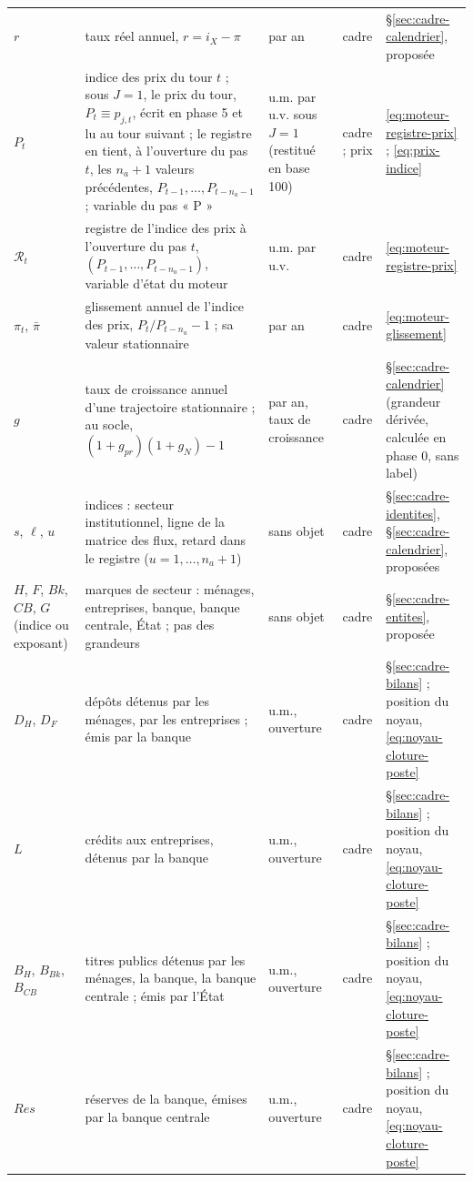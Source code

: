 \documentclass[11pt,a4paper]{article}
\begin{document}
\begin{center}
\begin{longtable}{>{\raggedright\arraybackslash}p{1.6cm}>{\raggedright\arraybackslash}p{5.6cm}>{\raggedright\arraybackslash}p{2.0cm}>{\raggedright\arraybackslash}p{2.2cm}>{\raggedright\arraybackslash}p{2.8cm}}
$r$ & taux réel annuel, $r = i_X - \pi$ & par an & cadre & \S\ref{sec:cadre-calendrier}, proposée\\
$P_t$ & indice des prix du tour $t$ ; sous $J = 1$, le prix du tour, $P_t \equiv p_{j,t}$, écrit en phase 5 et lu au tour suivant ; le registre en tient, à l'ouverture du pas $t$, les $n_a + 1$ valeurs précédentes, $P_{t-1}, \dots, P_{t-n_a-1}$ ; variable du pas « P » & u.m. par u.v. sous $J = 1$ (restitué en base 100) & cadre ; prix & \eqref{eq:moteur-registre-prix} ; \eqref{eq:prix-indice}\\
$\mathcal{R}_t$ & registre de l'indice des prix à l'ouverture du pas $t$, $(P_{t-1}, \dots, P_{t-n_a-1})$, variable d'état du moteur & u.m. par u.v. & cadre & \eqref{eq:moteur-registre-prix}\\
$\pi_t$, $\bar\pi$ & glissement annuel de l'indice des prix, $P_t/P_{t-n_a} - 1$ ; sa valeur stationnaire & par an & cadre & \eqref{eq:moteur-glissement}\\
$g$ & taux de croissance annuel d'une trajectoire stationnaire ; au socle, $(1 + g_{\mathit{pr}})(1 + g_N) - 1$ & par an, taux de croissance & cadre & \S\ref{sec:cadre-calendrier} (grandeur dérivée, calculée en phase 0, sans label)\\
$s$, $\ell$, $u$ & indices : secteur institutionnel, ligne de la matrice des flux, retard dans le registre ($u = 1, \dots, n_a + 1$) & sans objet & cadre & \S\ref{sec:cadre-identites}, \S\ref{sec:cadre-calendrier}, proposées\\
$H$, $F$, $\mathit{Bk}$, $\mathit{CB}$, $G$ (indice ou exposant) & marques de secteur : ménages, entreprises, banque, banque centrale, État ; pas des grandeurs & sans objet & cadre & \S\ref{sec:cadre-entites}, proposée\\
$D_H$, $D_F$ & dépôts détenus par les ménages, par les entreprises ; émis par la banque & u.m., ouverture & cadre & \S\ref{sec:cadre-bilans} ; position du noyau, \eqref{eq:noyau-cloture-poste}\\
$L$ & crédits aux entreprises, détenus par la banque & u.m., ouverture & cadre & \S\ref{sec:cadre-bilans} ; position du noyau, \eqref{eq:noyau-cloture-poste}\\
$B_H$, $B_{\mathit{Bk}}$, $B_{\mathit{CB}}$ & titres publics détenus par les ménages, la banque, la banque centrale ; émis par l'État & u.m., ouverture & cadre & \S\ref{sec:cadre-bilans} ; position du noyau, \eqref{eq:noyau-cloture-poste}\\
$\mathit{Res}$ & réserves de la banque, émises par la banque centrale & u.m., ouverture & cadre & \S\ref{sec:cadre-bilans} ; position du noyau, \eqref{eq:noyau-cloture-poste}\\

\end{longtable}
\end{center}
\end{document}
